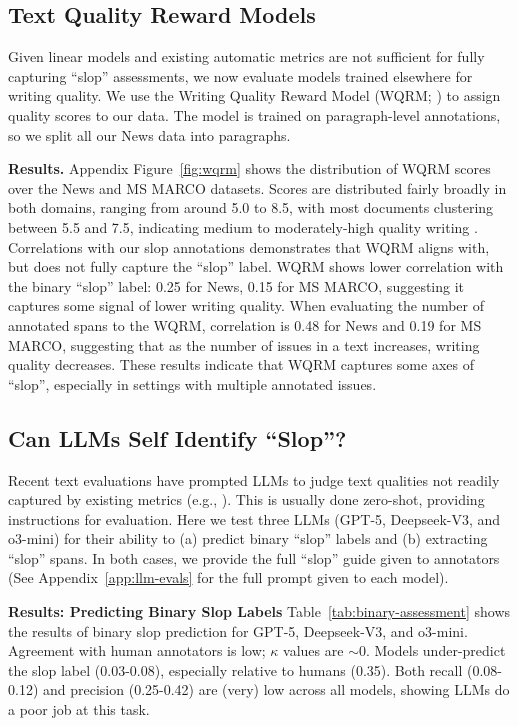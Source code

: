 \documentclass{article} %
\begin{document}
\subsection{Text Quality Reward Models} Given linear models and existing automatic metrics are not sufficient for fully capturing ``slop'' assessments, we now evaluate models trained elsewhere for writing quality. We use the Writing Quality Reward Model (WQRM; \citealt{chakrabarty2025ai}) to assign quality scores to our data. 
The model is trained on paragraph-level annotations, so we split all our News data into paragraphs. 


\textbf{Results.} Appendix Figure~\ref{fig:wqrm} shows the distribution of WQRM scores over the News and MS MARCO datasets. Scores are distributed fairly broadly in both domains, ranging from around 5.0 to 8.5, with most documents clustering between 5.5 and 7.5, indicating medium to moderately-high quality writing \citep{chakrabarty2025ai}. 
Correlations with our slop annotations demonstrates that WQRM aligns with, but does not fully capture the ``slop'' label. WQRM shows lower correlation with the binary ``slop'' label: 0.25 for News, 0.15 for MS MARCO, suggesting it captures some signal of lower writing quality. When evaluating the number of annotated spans to the WQRM, correlation is 0.48 for News and 0.19 for MS MARCO, suggesting that as the number of issues in a text increases, writing quality decreases. These results indicate that WQRM captures some axes of ``slop'', especially in settings with multiple annotated issues.


\subsection{Can LLMs Self Identify ``Slop''?}
\label{sec:llm-spot-slop}
Recent text evaluations have prompted LLMs to judge text qualities not readily captured by existing metrics (e.g., \citealt{liu2023g, Zhang2024VerbosityV}). 
This is usually done zero-shot, providing instructions for evaluation. 
Here we test three LLMs (GPT-5, Deepseek-V3, and o3-mini) for their ability to (a) predict binary ``slop'' labels and (b) extracting ``slop'' spans. In both cases, we provide the full ``slop'' guide given to annotators (See Appendix~\ref{app:llm-evals} for the full prompt given to each model). 

\textbf{Results: Predicting Binary Slop Labels} Table~\ref{tab:binary-assessment} shows the results of binary slop prediction for GPT-5, Deepseek-V3, and o3-mini. Agreement with human annotators is low;  $\kappa$ values are $\sim$0. 
Models under-predict the slop label (0.03-0.08), especially relative to humans (0.35). 
Both recall (0.08-0.12) and precision (0.25-0.42) are (very) low across all models, showing LLMs do a poor job at this task. 
\end{document}
